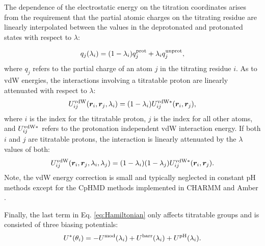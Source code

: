 The dependence of the electrostatic energy on the titration coordinates arises from the requirement that
the partial atomic charges on the titrating residue
are linearly interpolated  
between the values in the deprotonated and protonated states with respect to $\lambda$:

%
\begin{equation}
q_j(\lambda_i) = (1-\lambda_i) q_j^{\rm prot} +  \lambda_i q_j^{\rm unprot},
\label{eq:qlamb}
\end{equation}
where $q_j$ refers to the partial charge of an atom $j$ in the titrating residue $i$.
As to vdW energies, the 
interactions involving a titratable proton are linearly attenuated with respect to $\lambda$:
\begin{equation}
U^{\rm vdW}_{ij}(\bm r_i, \bm r_j, \lambda_i) = (1-\lambda_i)U^{\rm vdW\ast}_{ij}(\bm r_i, \bm r_j),
\end{equation}
where $i$ is the index for the titratable proton, $j$ is the index for all other atoms, and $U^{\rm vdW \ast}_{ij}$ refers to the protonation independent vdW interaction energy. If both $i$ and $j$ are titratable protons,
the interaction is linearly attenuated by the $\lambda$ values of both:
\begin{equation}
U^{\rm vdW}_{ij}(\bm r_i, \bm r_j, \lambda_i, \lambda_j) = (1-\lambda_i)(1-\lambda_j)U^{\rm vdW\ast}_{ij}(\bm r_i, \bm r_j).
\end{equation}
Note, the vdW energy correction is small and typically neglected in constant pH methods except for the CpHMD methods implemented in CHARMM and Amber \cite{Khandogin_Brooks_2005_Biophys.J.,Wallace_Shen_2011_J.Chem.TheoryComput.,Huang_Shen_2016_J.Chem.TheoryComput.,Huang_Shen_2018_J.Chem.Inf.Model.,Harris_Shen_2019_J.Chem.Inf.Model.}.

Finally, the last term in Eq. \ref{eq:Hamiltonian} 
only affects titratable groups and is consisted of 
three biasing potentials:
\begin{equation}
\label{eq:biasingpotential}
U^{\ast}(\theta_i)=-U^{\rm mod}(\lambda_i)+U^{\rm barr}(\lambda_i)+U^{\rm pH}(\lambda_i).
\end{equation}

